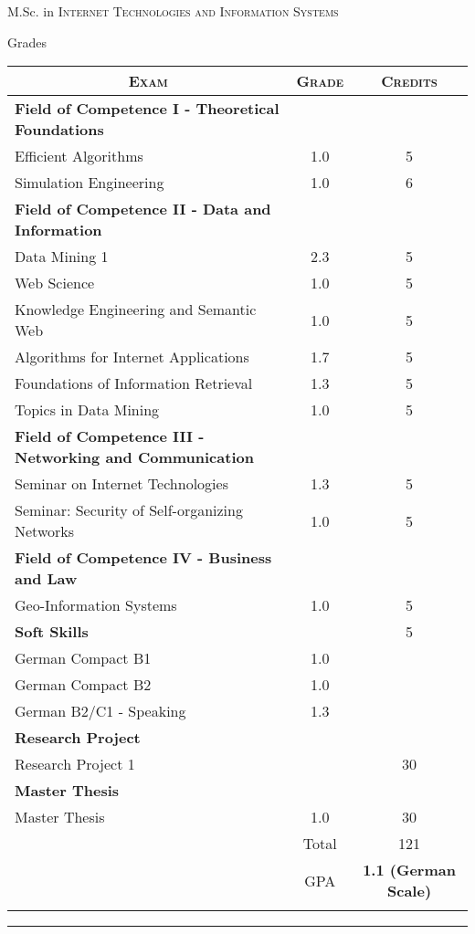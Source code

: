 \documentclass[a4paper,10pt]{article} %
\begin{document}
\par{\centering\Large \hypertarget{grds_itis}{M.Sc. in \textsc{Internet Technologies and Information Systems}}\par}\large{\centering Grades\par}\normalsize

\begin{center}
\begin{tabular}{lcc}
\multicolumn{1}{c}{\textsc{Exam}} & \textsc{Grade}&\textsc{Credits}\\ \hline
\textbf{Field of Competence I - Theoretical Foundations}\\
Efficient Algorithms & 1.0 & 5\\
Simulation Engineering & 1.0 & 6\\ 

\textbf{Field of Competence II - Data and Information}\\
Data Mining 1 & 2.3 & 5\\
Web Science & 1.0 & 5\\
Knowledge Engineering and Semantic Web & 1.0 & 5\\
Algorithms for Internet Applications & 1.7 & 5\\
Foundations of Information Retrieval & 1.3 & 5\\
Topics in Data Mining & 1.0 & 5\\ 

\textbf{Field of Competence III - Networking and Communication}\\
Seminar on Internet Technologies & 1.3 & 5\\
Seminar: Security of Self-organizing Networks & 1.0 & 5\\ 

\textbf{Field of Competence IV - Business and Law}\\
Geo-Information Systems & 1.0 & 5\\ 

\textbf{Soft Skills} & & 5\\
German Compact B1 & 1.0 &\\ 
German Compact B2 & 1.0 &\\ 
German B2/C1 - Speaking & 1.3 &\\  

\textbf{Research Project}\\
Research Project 1 & & 30\\

\textbf{Master Thesis}\\
Master Thesis & 1.0 & 30\\

& Total & 121\\\cline{2-3}
&\textsc{GPA}&\textbf{1.1 (German Scale)}\\ 
&&%
\end{tabular}
\end{center}
\bigskip
\hrule
\bigskip
\end{document}
